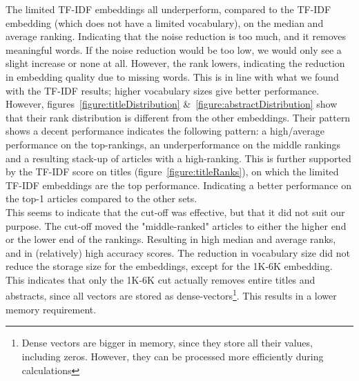 \documentclass[../../Thesis.tex]{subfiles}
\begin{document}
\begin{jumpin}
The limited TF-IDF embeddings all underperform, compared to the TF-IDF embedding (which does not have a limited vocabulary), on the median and average ranking. Indicating that the noise reduction is too much, and it removes meaningful words. If the noise reduction would be too low, we would only see a slight increase or none at all. However, the rank lowers, indicating the reduction in embedding quality due to missing words. This is in line with what we found with the TF-IDF results; higher vocabulary sizes give better performance. However, figures~\ref{figure:titleDistribution} \&~\ref{figure:abstractDistribution} show that their rank distribution is different from the other embeddings. Their pattern shows a decent performance indicates the following pattern: a high/average performance on the top-rankings, an underperformance on the middle rankings and a resulting stack-up of articles with a high-ranking. This is further supported by the TF-IDF score on titles (figure~\ref{figure:titleRanks}), on which the limited TF-IDF embeddings are the top performance. Indicating a better performance on the top-1 articles compared to the other sets.\\This seems to indicate that the cut-off was effective, but that it did not suit our purpose. The cut-off moved the "middle-ranked"  articles to either the higher end or the lower end of the rankings. Resulting in high median and average ranks, and in (relatively) high accuracy scores. The reduction in vocabulary size did not reduce the storage size for the embeddings, except for the 1K-6K embedding. This indicates that only the 1K-6K cut actually removes entire titles and abstracts, since all vectors are stored as dense-vectors\footnote{Dense vectors are bigger in memory, since they store all their values, including zeros. However, they can be processed more efficiently during calculations}. This results in a lower memory requirement.


\end{jumpin}
\end{document}
